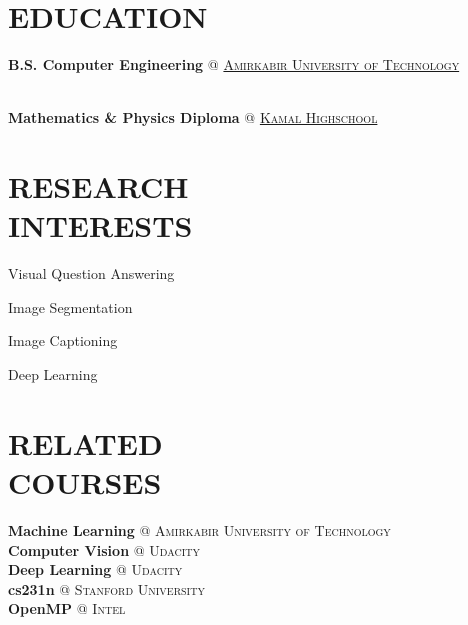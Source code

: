 \documentclass[margin, 10pt]{res} %
\begin{document}
    \begin{resume}
    
     
    \section{EDUCATION}  
    \textbf{B.S. Computer Engineering} \textsc{@}
	   \href{http://aut.ac.ir/aut/}{\textsc{Amirkabir University of Technology}}\\
	   {}\hfill {}\\
	   {}
 	\vspace{0.1cm}
 	
    \textbf{Mathematics \& Physics Diploma} \textsc{@}
    \href{http://www.kamal.sch.ir/}{\textsc{Kamal Highschool}}\hfill {}

   
	\section{RESEARCH \\ INTERESTS}
	\vspace{0.6cm}
		  	
	 \begin{innerlist}
	\begin{minipage}{0.4\linewidth}
		\item Visual Question Answering
		\item Image Segmentation
	\end{minipage}
	\begin{minipage}{0.4\linewidth}	
		\item Image Captioning
		\item Deep Learning
	\end{minipage}
\end{innerlist}
		\vspace{0.2cm}
		
  	\section{RELATED \\ COURSES}
	\textbf{Machine Learning} \textsc{@} \textsc{Amirkabir University of Technology}\\
	\textbf{Computer Vision} \textsc{@} \textsc{Udacity}\\
	\textbf{Deep Learning} \textsc{@} \textsc{Udacity}\\
	\textbf{cs231n} \textsc{@} \textsc{Stanford University}\\
	\textbf{OpenMP} \textsc{@} \textsc{Intel}\\

\end{resume}
\end{document}
